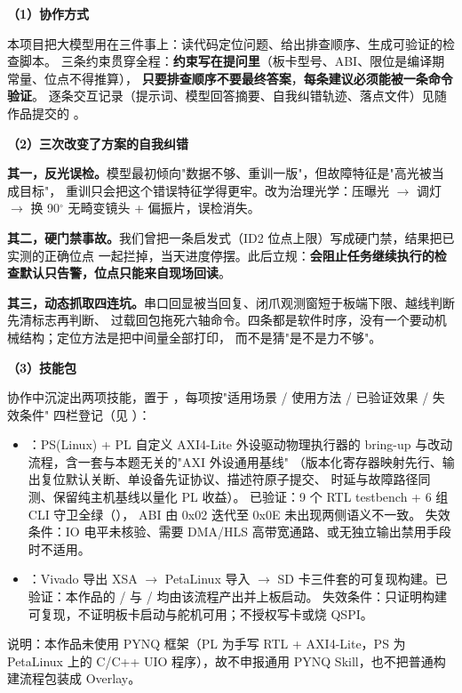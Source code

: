 {\small

\noindent\textbf{（1）协作方式}

本项目把大模型用在三件事上：读代码定位问题、给出排查顺序、生成可验证的检查脚本。
三条约束贯穿全程：\textbf{约束写在提问里}（板卡型号、ABI、限位是编译期常量、位点不得推算），
\textbf{只要排查顺序不要最终答案}，\textbf{每条建议必须能被一条命令验证}。
逐条交互记录（提示词、模型回答摘要、自我纠错轨迹、落点文件）见随作品提交的
。

\noindent\textbf{（2）三次改变了方案的自我纠错}

\textbf{其一，反光误检。}模型最初倾向"数据不够、重训一版"，但故障特征是"高光被当成目标"，
重训只会把这个错误特征学得更牢。改为治理光学：压曝光 $\rightarrow$ 调灯
$\rightarrow$ 换 90$^\circ$ 无畸变镜头 + 偏振片，误检消失。

\textbf{其二，硬门禁事故。}我们曾把一条启发式（ID2 位点上限）写成硬门禁，结果把已实测的正确位点
一起拦掉，当天进度停摆。此后立规：\textbf{会阻止任务继续执行的检查默认只告警，位点只能来自现场回读}。

\textbf{其三，动态抓取四连坑。}串口回显被当回复、闭爪观测窗短于板端下限、越线判断先清标志再判断、
过载回包拖死六轴命令。四条都是软件时序，没有一个要动机械结构；定位方法是把中间量全部打印，
而不是猜"是不是力不够"。

\noindent\textbf{（3）技能包}

协作中沉淀出两项技能，置于 ，每项按"适用场景 / 使用方法 / 已验证效果 / 失效条件"
四栏登记（见 ）：

\begin{itemize}
  \item {}：PS(Linux) + PL 自定义 AXI4-Lite 外设驱动物理执行器的
        bring-up 与改动流程，含一套与本题无关的"AXI 外设通用基线"
        （版本化寄存器映射先行、输出复位默认关断、单设备先证协议、描述符原子提交、
        时延与故障路径同测、保留纯主机基线以量化 PL 收益）。
        已验证：9 个 RTL testbench + 6 组 CLI 守卫全绿（），
        ABI 由 0x02 迭代至 0x0E 未出现两侧语义不一致。
        失效条件：IO 电平未核验、需要 DMA/HLS 高带宽通路、或无独立输出禁用手段时不适用。
  \item {}：Vivado 导出 XSA $\rightarrow$ PetaLinux 导入
        $\rightarrow$ SD 卡三件套的可复现构建。已验证：本作品的 / 与
        / 均由该流程产出并上板启动。
        失效条件：只证明构建可复现，不证明板卡启动与舵机可用；不授权写卡或烧 QSPI。
\end{itemize}

\noindent 说明：本作品未使用 PYNQ 框架（PL 为手写 RTL + AXI4-Lite，PS 为 PetaLinux 上的 C/C++ UIO
程序），故不申报通用 PYNQ Skill，也不把普通构建流程包装成 Overlay。
}
